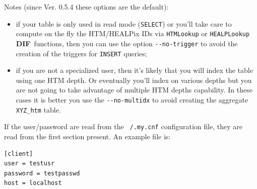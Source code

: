 \documentclass[10pt,titlepage]{article}
\newcommand{\dif}{\textbf{\small DIF}}
\begin{document}
Notes (since Ver. 0.5.4 these options are the default):
\begin{itemize}
\item if your table is only used in read mode (\verb|SELECT|) or you'll take
 care to compute on the fly the HTM/HEALPix IDs via \verb|HTMLookup| or
 \verb|HEALPLookup| \dif\ functions, then you can use the option
 \verb|--no-trigger| to avoid the creation of the triggers for \verb|INSERT|
 queries; 
\item if you are not a specialized user, then it's likely that you will
 index the table using one HTM depth. Or eventually you'll index on various depths
 but you are not going to take advantage of multiple HTM depths capability.
 In these cases it is better you use the \verb|--no-multidx| to avoid creating
 the aggregate \verb|XYZ_htm| table.
%
\end{itemize}

If the user/password are read from the \texttt{~/.my.cnf} configuration file,
they are read from the first section present. An example file is:
\begin{verbatim}
[client]
user = testusr
password = testpasswd
host = localhost
\end{verbatim}

%
\end{document}

